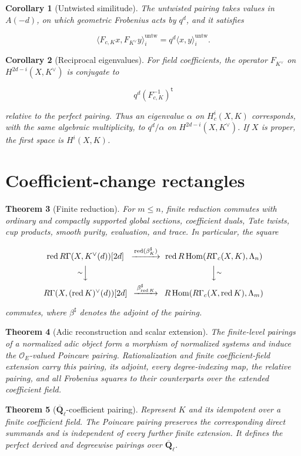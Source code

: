 \documentclass[10pt]{article}
\newtheorem{theorem}{Theorem}[section]
\newtheorem{corollary}[theorem]{Corollary}
\theoremstyle{definition}
\newcommand{\Qlb}{\overline{\mathbf Q}_\ell}
\newcommand{\OO}{\mathcal O}
\newcommand{\RG}{R\Gamma}
\newcommand{\RGc}{R\Gamma_c}
\newcommand{\red}{\operatorname{red}}
\begin{document}
\begin{corollary}[Untwisted similitude]
The untwisted pairing takes values in \(A(-d)\), on which geometric
Frobenius acts by \(q^d\), and it satisfies

\[
 \bigl\langle F_{c,K}x,F_{K^\vee}y\bigr\rangle_i^{\mathrm{untw}}
 =q^d\langle x,y\rangle_i^{\mathrm{untw}}.
\]
\end{corollary}

\begin{corollary}[Reciprocal eigenvalues]
For field coefficients, the operator \(F_{K^\vee}\) on
\(H^{2d-i}(X,K^\vee)\) is conjugate to

\[
 q^d(F_{c,K}^{-1})^{\mathsf t}
\]

relative to the perfect pairing.  Thus an eigenvalue \(\alpha\) on
\(H_c^i(X,K)\) corresponds, with the same algebraic multiplicity, to
\(q^d/\alpha\) on \(H^{2d-i}(X,K^\vee)\).  If \(X\) is proper, the first
space is \(H^i(X,K)\).
\end{corollary}

\section{Coefficient-change rectangles}

\begin{theorem}[Finite reduction]
For \(m\leq n\), finite reduction commutes with ordinary and compactly
supported global sections, coefficient duals, Tate twists, cup products,
smooth purity, evaluation, and trace.  In particular, the square

\[
\begin{CD}
\red\RG(X,K^\vee(d))[2d] @>{\red(\beta_K^\sharp)}>>
\red R\operatorname{Hom}(\RGc(X,K),\Lambda_n)\\
@V{\sim}VV @VV{\sim}V\\
\RG(X,(\red K)^\vee(d))[2d] @>{\beta_{\red K}^\sharp}>>
R\operatorname{Hom}(\RGc(X,\red K),\Lambda_m)
\end{CD}
\]

commutes, where \(\beta^\sharp\) denotes the adjoint of the pairing.
\end{theorem}

\begin{theorem}[Adic reconstruction and scalar extension]
The finite-level pairings of a normalized adic object form a morphism of
normalized systems and induce the \(\OO_E\)-valued Poincare pairing.
Rationalization and finite coefficient-field extension carry this pairing,
its adjoint, every degree-indexing map, the relative pairing, and all
Frobenius squares to their counterparts over the extended coefficient field.
\end{theorem}

\begin{theorem}[\(\Qlb\)-coefficient pairing]
Represent \(K\) and its idempotent over a finite coefficient field.  The
Poincare pairing preserves the corresponding direct summands and is
independent of every further finite extension.  It defines the
perfect derived and degreewise pairings over \(\Qlb\).
\end{theorem}
\end{document}
